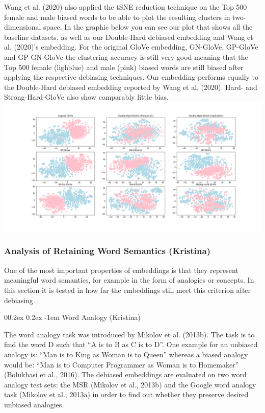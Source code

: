 \documentclass[
  english,
  man,floatsintext]{apa6}
\makeatletter
\let\oldparagraph\paragraph
\renewcommand{\paragraph}[1]{\oldparagraph{#1}\mbox{}}
\renewcommand{\paragraph}{\@startsection{paragraph}{4}{\parindent}%
  {0\baselineskip \@plus 0.2ex \@minus 0.2ex}%
  {-1em}%
  {\normalfont\normalsize\bfseries\itshape\typesectitle}}
\makeatother
\begin{document}
Wang et al. (2020) also applied the tSNE reduction technique on the Top 500 female and male biased words to be able to plot the resulting clusters in two-dimensional space. In the graphic below you can see our plot that shows all the baseline datasets, as well as our Double-Hard debiased embedding and Wang et al. (2020)'s embedding. For the original GloVe embedding, GN-GloVe, GP-GloVe and GP-GN-GloVe the clustering accuracy is still very good meaning that the Top 500 female (lighblue) and male (pink) biased words are still biased after applying the respective debiasing techniques. Our embedding performs equally to the Double-Hard debiased embedding reported by Wang et al. (2020). Hard- and Strong-Hard-GloVe also show comparably little bias.
\includegraphics{evaluation_results/results_tsne.png}

\hypertarget{analysis-of-retaining-word-semantics-kristina}{%
\subsubsection{Analysis of Retaining Word Semantics (Kristina)}\label{analysis-of-retaining-word-semantics-kristina}}

One of the most important properties of embeddings is that they represent meaningful word semantics, for example in the form of analogies or concepts. In this section it is tested in how far the embeddings still meet this criterion after debiasing.

\hypertarget{word-analogy-kristina}{%
\paragraph{Word Analogy (Kristina)}\label{word-analogy-kristina}}

The word analogy task was introduced by Mikolov et al. (2013b). The task is to find the word D such that \enquote{A is to B as C is to D}. One example for an unbiased analogy is: \enquote{Man is to King as Woman is to Queen} whereas a biased analogy would be: \enquote{Man is to Computer Programmer as Woman is to Homemaker} (Bolukbasi et al., 2016). The debiased embeddings are evaluated on two word analogy test sets: the MSR (Mikolov et al., 2013b) and the Google word analogy task (Mikolov et al., 2013a) in order to find out whether they preserve desired unbiased analogies.
\end{document}
